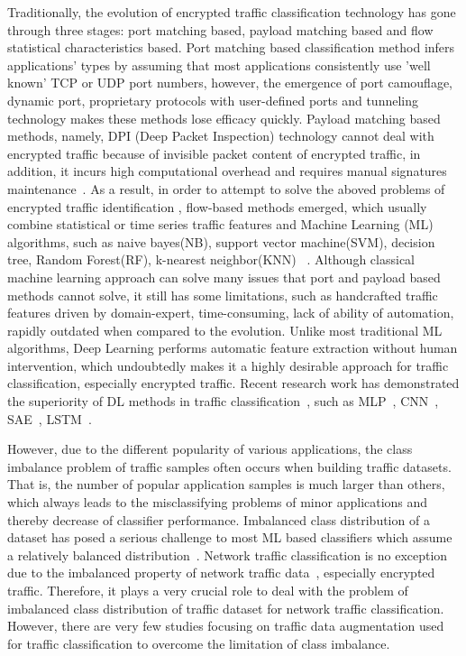 \documentclass[conference]{IEEEtran}
\begin{document}
Traditionally, the evolution of encrypted traffic classification technology has gone through three stages: port matching based, payload matching based and flow statistical characteristics based. Port matching based classification method infers applications' types by assuming that most applications consistently use 'well known' TCP or UDP port numbers, however, the emergence of port camouflage, dynamic port, proprietary protocols with user-defined ports and tunneling technology makes these methods lose efficacy quickly. Payload matching based methods, namely, DPI (Deep Packet Inspection) technology cannot deal with encrypted traffic because of invisible packet content of encrypted traffic, in addition, it incurs high computational overhead and requires manual signatures maintenance~\cite{Finsterbusch2014,SDN-HGU,PhoneNumber}. As a result, in order to attempt to solve the aboved problems of encrypted traffic identification , flow-based methods emerged, which usually combine statistical or time series traffic features and Machine Learning (ML) algorithms,  such as naive bayes(NB), support vector machine(SVM), decision tree, Random Forest(RF), k-nearest neighbor(KNN) ~\cite{Pescape2008,Sun2010,Velan2015,Arndt2011}. Although classical machine learning approach can solve many issues that port and payload based methods cannot solve, it still has some limitations, such as handcrafted traffic features driven by domain-expert, time-consuming, lack of ability of automation, rapidly outdated when compared to the evolution. Unlike most traditional ML algorithms, Deep Learning performs automatic feature extraction without human intervention, which undoubtedly makes it a highly desirable approach for traffic classification, especially encrypted traffic.  Recent research work has demonstrated the superiority of DL methods in traffic classification~\cite{MobileTC-2018}, such as MLP~\cite{Datanet}, CNN~\cite{deeppacket,Wang-1D-CNN,Wang2D-CNN,Seq2Img,HierarchicalTC}, SAE~\cite{blackhat}, LSTM~\cite{IoT-CNN-2017,HAST-IDS}. 





However, due to the different popularity of various applications, the class imbalance problem of traffic samples often occurs when building traffic datasets. That is, the number of popular application samples is much larger than others, which always leads to the misclassifying problems of minor applications and thereby decrease of classifier performance. Imbalanced class distribution of a dataset has posed a serious challenge to most ML based classifiers which assume a relatively balanced distribution~\cite{Japkowicz:2002}. Network traffic classification is no exception due to the imbalanced property of network traffic data~\cite{Vu2017,Vu2016}, especially encrypted traffic. Therefore, it plays a very crucial role to deal with the problem of imbalanced class distribution of traffic dataset for network traffic classification. However, there are very few studies focusing on traffic data augmentation used for traffic classification to overcome the limitation of class imbalance.
\end{document}
